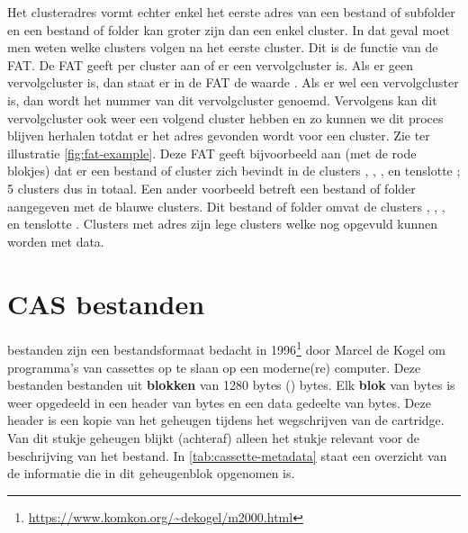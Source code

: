 Het clusteradres vormt echter enkel het eerste adres van een bestand of subfolder en een bestand of folder kan groter zijn dan een enkel cluster. In dat geval moet men weten welke clusters volgen na het eerste cluster. Dit is de functie van de FAT. De FAT geeft per cluster aan of er een vervolgcluster is. Als er geen vervolgcluster is, dan staat er in de FAT de waarde . Als er wel een vervolgcluster is, dan wordt het nummer van dit vervolgcluster genoemd. Vervolgens kan dit vervolgcluster ook weer een volgend cluster hebben en zo kunnen we dit proces blijven herhalen totdat er het adres  gevonden wordt voor een cluster. Zie ter illustratie \cref{fig:fat-example}. Deze FAT geeft bijvoorbeeld aan (met de rode blokjes) dat er een bestand of cluster zich bevindt in de clusters , , ,  en tenslotte ; 5 clusters dus in totaal. Een ander voorbeeld betreft een bestand of folder aangegeven met de blauwe clusters. Dit bestand of folder omvat de clusters , , ,  en tenslotte . Clusters met adres  zijn lege clusters welke nog opgevuld kunnen worden met data.

%
%
%
\section{CAS bestanden}
\label{sec:cas-files}

 bestanden zijn een bestandsformaat bedacht in 1996\footnote{\url{https://www.komkon.org/~dekogel/m2000.html}} door Marcel de Kogel om programma's van  cassettes op te slaan op een moderne(re) computer. Deze bestanden bestanden uit \textbf{blokken} van 1280 bytes () bytes. Elk \textbf{blok} van  bytes is weer opgedeeld in een header van  bytes en een data gedeelte van  bytes. Deze header is een kopie van het geheugen  tijdens het wegschrijven van de cartridge. Van dit stukje geheugen blijkt (achteraf) alleen het stukje  relevant voor de beschrijving van het  bestand. In \cref{tab:cassette-metadata} staat een overzicht van de informatie die in dit geheugenblok opgenomen is.


